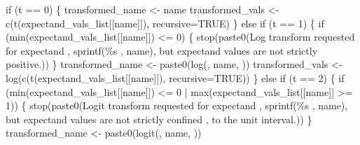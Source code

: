 \documentclass[
  letterpaper,
  DIV=11,
  numbers=noendperiod]{scrartcl}
\newenvironment{Shaded}{\begin{snugshade}}{\end{snugshade}}
\newcommand{\BuiltInTok}[1]{\textcolor[rgb]{0.00,0.23,0.31}{#1}}
\newcommand{\ControlFlowTok}[1]{\textcolor[rgb]{0.00,0.23,0.31}{#1}}
\newcommand{\DecValTok}[1]{\textcolor[rgb]{0.68,0.00,0.00}{#1}}
\newcommand{\NormalTok}[1]{\textcolor[rgb]{0.00,0.23,0.31}{#1}}
\newcommand{\OperatorTok}[1]{\textcolor[rgb]{0.37,0.37,0.37}{#1}}
\newcommand{\SpecialCharTok}[1]{\textcolor[rgb]{0.37,0.37,0.37}{#1}}
\newcommand{\StringTok}[1]{\textcolor[rgb]{0.13,0.47,0.30}{#1}}
\begin{document}
\begin{Shaded}
\begin{Highlighting}[]
  \ControlFlowTok{if}\NormalTok{ (t }\OperatorTok{==} \DecValTok{0}\NormalTok{) \{}
\NormalTok{    transformed\_name }\OperatorTok{\textless{}{-}}\NormalTok{ name}
\NormalTok{    transformed\_vals }\OperatorTok{\textless{}{-}}\NormalTok{ c(t(expectand\_vals\_list[[name]]),}
\NormalTok{                            recursive}\OperatorTok{=}\NormalTok{TRUE)}
\NormalTok{  \} }\ControlFlowTok{else} \ControlFlowTok{if}\NormalTok{ (t }\OperatorTok{==} \DecValTok{1}\NormalTok{) \{}
    \ControlFlowTok{if}\NormalTok{ (}\BuiltInTok{min}\NormalTok{(expectand\_vals\_list[[name]]) }\OperatorTok{\textless{}=} \DecValTok{0}\NormalTok{) \{}
\NormalTok{      stop(paste0(}\StringTok{\textquotesingle{}Log transform requested for expectand \textquotesingle{}}\NormalTok{,}
\NormalTok{                  sprintf(}\StringTok{\textquotesingle{}}\SpecialCharTok{\%s}\StringTok{ \textquotesingle{}}\NormalTok{, name),}
                  \StringTok{\textquotesingle{}but expectand values are not strictly positive.\textquotesingle{}}\NormalTok{))}
\NormalTok{    \}}
\NormalTok{    transformed\_name }\OperatorTok{\textless{}{-}}\NormalTok{ paste0(}\StringTok{\textquotesingle{}log(\textquotesingle{}}\NormalTok{, name, }\StringTok{\textquotesingle{})\textquotesingle{}}\NormalTok{)}
\NormalTok{    transformed\_vals }\OperatorTok{\textless{}{-}}\NormalTok{ log(c(t(expectand\_vals\_list[[name]]),}
\NormalTok{                              recursive}\OperatorTok{=}\NormalTok{TRUE))}
\NormalTok{  \} }\ControlFlowTok{else} \ControlFlowTok{if}\NormalTok{ (t }\OperatorTok{==} \DecValTok{2}\NormalTok{) \{}
    \ControlFlowTok{if}\NormalTok{ (}\BuiltInTok{min}\NormalTok{(expectand\_vals\_list[[name]]) }\OperatorTok{\textless{}=} \DecValTok{0} \OperatorTok{|}
        \BuiltInTok{max}\NormalTok{(expectand\_vals\_list[[name]] }\OperatorTok{\textgreater{}=} \DecValTok{1}\NormalTok{)) \{}
\NormalTok{      stop(paste0(}\StringTok{\textquotesingle{}Logit transform requested for expectand \textquotesingle{}}\NormalTok{,}
\NormalTok{                  sprintf(}\StringTok{\textquotesingle{}}\SpecialCharTok{\%s}\StringTok{ \textquotesingle{}}\NormalTok{ , name),}
                  \StringTok{\textquotesingle{}but expectand values are not strictly confined \textquotesingle{}}\NormalTok{,}
                  \StringTok{\textquotesingle{}to the unit interval.\textquotesingle{}}\NormalTok{))}
\NormalTok{    \}}
\NormalTok{    transformed\_name }\OperatorTok{\textless{}{-}}\NormalTok{ paste0(}\StringTok{\textquotesingle{}logit(\textquotesingle{}}\NormalTok{, name, }\StringTok{\textquotesingle{})\textquotesingle{}}\NormalTok{)}

\end{Highlighting}
\end{Shaded}
\end{document}
